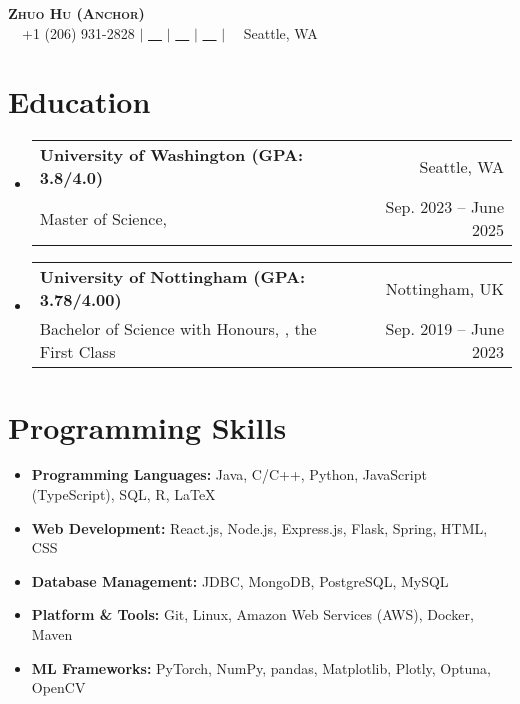 \documentclass[letterpaper,10pt]{article}
\makeatletter
\newcommand{\link}[1]{\color{myBlue}{#1}}
\newcommand{\resumeSubheading}[4]{
  \vspace{-2pt}\item
    \begin{tabular*}{0.97\textwidth}[t]{l@{\extracolsep{\fill}}r}
      \textbf{#1} & #2 \\
      \small#3 & \small #4 \\
    \end{tabular*}\vspace{-7pt}
}
\newcommand{\resumeSubHeadingListStart}{\begin{itemize}[leftmargin=0.15in, label={}]}
\newcommand{\resumeSubHeadingListEnd}{\end{itemize}}
\makeatother
\begin{document}
\begin{center}
  \textbf{\Huge \scshape Zhuo Hu (Anchor)} \\ \vspace{1pt}
  \small \faMobile \ \ +1 (206) 931-2828 $|$ \href{mailto:uwzhuohu@uw.edu}{\faEnvelope \ \ \link{uwzhuohu@uw.edu}} $|$
  \href{https://linkedin.com/in/zhuo-hu}{\faLinkedin \ \ \link{LinkedIn}} $|$
  \href{https://github.com/Anchor-ZhuoHU}{\faGithub \ \ \link{GitHub}} $|$
  \faBuilding \ \ Seattle, WA
\end{center}
\section{Education}
\resumeSubHeadingListStart
\resumeSubheading
{University of Washington (GPA: 3.8/4.0)}{Seattle, WA}
{Master of Science, \href{https://www.ece.uw.edu/}{\link{Electrical and Computer Engineering}}}{Sep. 2023 -- June 2025}
\resumeSubheading
{University of Nottingham (GPA: 3.78/4.00)}{Nottingham, UK}
{Bachelor of Science with Honours, \href{https://www.nottingham.ac.uk/mathematics/}{\link{Mathematics with Applied Mathematics}}, the First Class}{Sep. 2019 -- June 2023}
\resumeSubHeadingListEnd
\section{Programming Skills}
\resumeSubHeadingListStart
\setlength\itemsep{0em}
\item \textbf{Programming Languages:} Java, C/C++, Python, JavaScript (TypeScript), SQL, R, \LaTeX
\item \textbf{Web Development:} React.js, Node.js, Express.js, Flask, Spring, HTML, CSS
\item \textbf{Database Management:} JDBC, MongoDB, PostgreSQL, MySQL
\item \textbf{Platform \& Tools:} Git, Linux, Amazon Web Services (AWS), Docker, Maven
\item \textbf{ML Frameworks:} PyTorch, NumPy, pandas, Matplotlib, Plotly, Optuna, OpenCV
\vspace{-8pt}
\resumeSubHeadingListEnd
\end{document}
